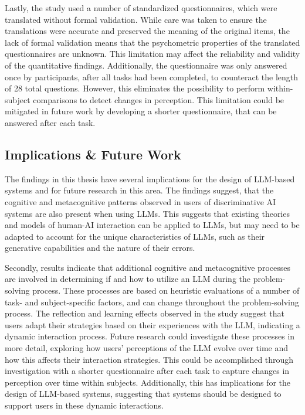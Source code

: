 Lastly, the study used a number of standardized questionnaires, which were translated without formal validation. While care was taken to ensure the translations were accurate and preserved the meaning of the original items, the lack of formal validation means that the psychometric properties of the translated questionnaires are unknown. This limitation may affect the reliability and validity of the quantitative findings. Additionally, the questionnaire was only answered once by participants, after all tasks had been completed, to counteract the length of 28 total questions. However, this eliminates the possibility to perform within-subject comparisons to detect changes in perception. This limitation could be mitigated in future work by developing a shorter questionnaire, that can be answered after each task.

\subsection{Implications \& Future Work} \label{ssec:implications}

The findings in this thesis have several implications for the design of LLM-based systems and for future research in this area. The findings suggest, that the cognitive and metacognitive patterns observed in users of discriminative \ac{AI} systems are also present when using LLMs. This suggests that existing theories and models of human-AI interaction can be applied to LLMs, but may need to be adapted to account for the unique characteristics of LLMs, such as their generative capabilities and the nature of their errors.

Secondly, results indicate that additional cognitive and metacognitive processes are involved in determining if and how to utilize an LLM during the problem-solving process. These processes are based on heuristic evaluations of a number of task- and subject-specific factors, and can change throughout the problem-solving process. The reflection and learning effects observed in the study suggest that users adapt their strategies based on their experiences with the LLM, indicating a dynamic interaction process. Future research could investigate these processes in more detail, exploring how users' perceptions of the LLM evolve over time and how this affects their interaction strategies. This could be accomplished through investigation with a shorter questionnaire after each task to capture changes in perception over time within subjects. Additionally, this has implications for the design of LLM-based systems, suggesting that systems should be designed to support users in these dynamic interactions.

